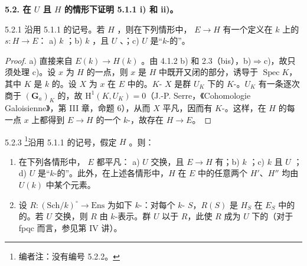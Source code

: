 \textbf{5.2. 在 $U$ 且 $H$ 的情形下证明 5.1.1 i) 和 ii)。}
\begin{SGAresult}{}{5.2.1}
沿用 5.1.1 的记号。若 $H$ ，则在下列情形中， $E\to H$ 有一个定义在 $k$ 上的 $s:H\to E$：
a) $k$ ；b) $k$ ，且 $U$ 、；c) $U$ 是“$k$-的”。
\end{SGAresult}
\begin{proof}
a) 直接来自 $E(k)\to H(k)$ 。由 4.1.2 b) 和 2.3（bis），b)$\Rightarrow$c)，故只须处理 c)。设 $x$ 为 $H$ 的一点，则 $x$ 是 $H$ 中既开又闭的部分，诱导于 $\operatorname{Spec}K$，其中 $K$ 是 $k$ 的。设 $X$ 为 $x$ 在 $E$ 中的。$K$- $X$ 是群 $U_K$ 下的 $K$-。$U_K$ 有一条逐次商于 $(\mathbf G_a)_K$ 的，故 $\mathrm H^1(K,U_K)=0$（J.-P. Serre，《Cohomologie Galoisienne》，第 III 章，命题 6），从而 $X$ 平凡，因而有 $K$-。这样，在 $H$ 的每一点 $x$ 上都得到 $E\to H$ 的一个 $k$-，故存在 $H\to E$。
\end{proof}
\begin{SGAresult}{}{5.2.3}
\footnote{编者注：没有编号 5.2.2。}沿用 5.1.1 的记号，假定 $H$ 。则：
\begin{enumerate}
\item[i)] 在下列各情形中， $E$ 都平凡：
a) $U$ 交换，且 $E\to H$ 有；b) $k$ ；c) $k$ 且 $U$ ；d) $U$ 是“$k$-的”。此外，在上述各情形中，$H$ 在 $E$ 中的任意两个 $H'$、$H''$ 均由 $U(k)$ 中某个元素。
\item[ii)] 设 $R:(\mathrm{Sch}/k)^\circ\to\mathrm{Ens}$ 为如下 $k$-：对每个 $k$- $S$，$R(S)$ 是 $H_S$ 在 $E_S$ 中的的。若 $U$ 交换，则 $R$ 由 $k$-表示。群 $U$ 以于 $R$，此使 $R$ 成为 $U$ 下的（对于 fpqc 而言，参见第 IV 讲）。
\end{enumerate}
\end{SGAresult}

